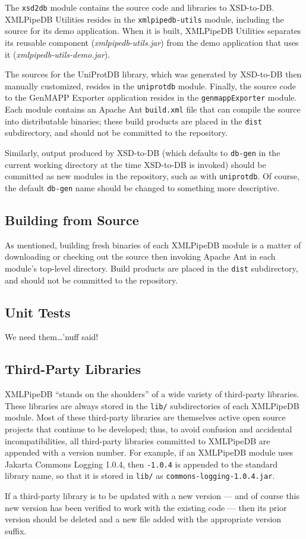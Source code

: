 \documentclass[11pt]{article}
\begin{document}
The \texttt{xsd2db} module contains the source code and libraries to XSD-to-DB.  XMLPipeDB Utilities resides in the \texttt{xmlpipedb-utils} module, including the source for its demo application.  When it is built, XMLPipeDB Utilities separates its reusable component (\emph{xmlpipedb-utils.jar}) from the demo application that uses it (\emph{xmlpipedb-utils-demo.jar}).

The sources for the UniProtDB library, which was generated by XSD-to-DB then manually customized, resides in the \texttt{uniprotdb} module.  Finally, the source code to the GenMAPP Exporter application resides in the \texttt{genmappExporter} module.  Each module contains an Apache Ant \texttt{build.xml} file that can compile the source into distributable binaries; these build products are placed in the \texttt{dist} subdirectory, and should not be committed to the repository.

Similarly, output produced by XSD-to-DB (which defaults to \texttt{db-gen} in the current working directory at the time XSD-to-DB is invoked) should be committed as new modules in the repository, such as with \texttt{uniprotdb}.  Of course, the default \texttt{db-gen} name should be changed to something more descriptive.

\subsection{Building from Source}

As mentioned, building fresh binaries of each XMLPipeDB module is a matter of downloading or checking out the source then invoking Apache Ant in each module's top-level directory.  Build products are placed in the \texttt{dist} subdirectory, and should not be committed to the repository.

\subsection{Unit Tests}

We need them\ldots'nuff said!

\subsection{Third-Party Libraries}

XMLPipeDB ``stands on the shoulders'' of a wide variety of third-party libraries.  These libraries are always stored in the \texttt{lib/} subdirectories of each XMLPipeDB module.  Most of these third-party libraries are themselves active open source projects that continue to be developed; thus, to avoid confusion and accidental incompatibilities, all third-party libraries committed to XMLPipeDB are appended with a version number.  For example, if an XMLPipeDB module uses Jakarta Commons Logging 1.0.4, then \texttt{-1.0.4} is appended to the standard library name, so that it is stored in \texttt{lib/} as \texttt{commons-logging-1.0.4.jar}.

If a third-party library is to be updated with a new version --- and of course this new version has been verified to work with the existing code --- then its prior version should be deleted and a new file added with the appropriate version suffix.
\end{document}
